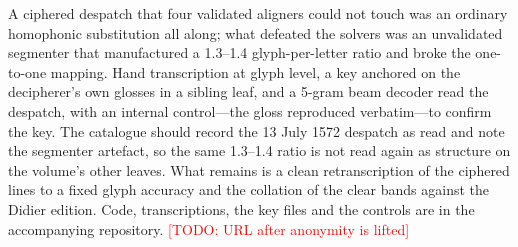 \documentclass[11pt]{article}
\newcommand{\todo}[1]{\textcolor{red}{[TODO: #1]}}
\begin{document}
A ciphered despatch that four validated aligners could not touch was an ordinary homophonic substitution all along; what defeated the solvers was an unvalidated segmenter that manufactured a 1.3--1.4 glyph-per-letter ratio and broke the one-to-one mapping. Hand transcription at glyph level, a key anchored on the decipherer's own glosses in a sibling leaf, and a 5-gram beam decoder read the despatch, with an internal control---the gloss reproduced verbatim---to confirm the key. The catalogue should record the 13 July 1572 despatch as read and note the segmenter artefact, so the same 1.3--1.4 ratio is not read again as structure on the volume's other leaves. What remains is a clean retranscription of the ciphered lines to a fixed glyph accuracy and the collation of the clear bands against the Didier edition. Code, transcriptions, the key files and the controls are in the accompanying repository. \todo{URL after anonymity is lifted}



\end{document}

